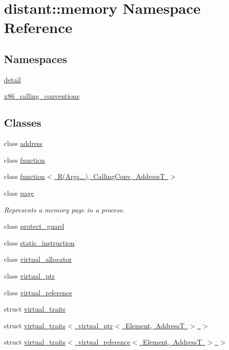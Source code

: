 \hypertarget{namespacedistant_1_1memory}{}\section{distant\+:\+:memory Namespace Reference}
\label{namespacedistant_1_1memory}
\subsection*{Namespaces}
\begin{DoxyCompactItemize}
\item 
 \mbox{\hyperlink{namespacedistant_1_1memory_1_1detail}{detail}}
\item 
 \mbox{\hyperlink{namespacedistant_1_1memory_1_1x86__calling__conventions}{x86\+\_\+calling\+\_\+conventions}}
\end{DoxyCompactItemize}
\subsection*{Classes}
\begin{DoxyCompactItemize}
\item 
class \mbox{\hyperlink{classdistant_1_1memory_1_1address}{address}}
\item 
class \mbox{\hyperlink{classdistant_1_1memory_1_1function}{function}}
\item 
class \mbox{\hyperlink{classdistant_1_1memory_1_1function_3_01_r_07_args_8_8_8_08_00_01_calling_conv_00_01_address_t_01_4}{function$<$ R(\+Args...), Calling\+Conv, Address\+T $>$}}
\item 
class \mbox{\hyperlink{classdistant_1_1memory_1_1page}{page}}
\begin{DoxyCompactList}\small\item\em Represents a memory page in a process. \end{DoxyCompactList}\item 
class \mbox{\hyperlink{classdistant_1_1memory_1_1protect__guard}{protect\+\_\+guard}}
\item 
class \mbox{\hyperlink{classdistant_1_1memory_1_1static__instruction}{static\+\_\+instruction}}
\item 
class \mbox{\hyperlink{classdistant_1_1memory_1_1virtual__allocator}{virtual\+\_\+allocator}}
\item 
class \mbox{\hyperlink{classdistant_1_1memory_1_1virtual__ptr}{virtual\+\_\+ptr}}
\item 
class \mbox{\hyperlink{classdistant_1_1memory_1_1virtual__reference}{virtual\+\_\+reference}}
\item 
struct \mbox{\hyperlink{structdistant_1_1memory_1_1virtual__traits}{virtual\+\_\+traits}}
\item 
struct \mbox{\hyperlink{structdistant_1_1memory_1_1virtual__traits_3_01virtual__ptr_3_01_element_00_01_address_t_01_4_01_4}{virtual\+\_\+traits$<$ virtual\+\_\+ptr$<$ Element, Address\+T $>$ $>$}}
\item 
struct \mbox{\hyperlink{structdistant_1_1memory_1_1virtual__traits_3_01virtual__reference_3_01_element_00_01_address_t_01_4_01_4}{virtual\+\_\+traits$<$ virtual\+\_\+reference$<$ Element, Address\+T $>$ $>$}}
\end{DoxyCompactItemize}
